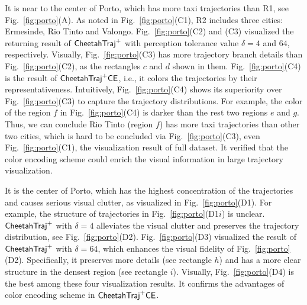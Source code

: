  It is near to the center of Porto, which has more taxi trajectories than R1, see Fig.~\ref{fig:porto}(A).
As noted in Fig.~\ref{fig:porto}(C1), R2 includes three cities: Ermesinde, Rio Tinto and Valongo.
Fig.~\ref{fig:porto}(C2) and (C3) visualized the returning result of $\mathsf{CheetahTraj}^{+}$ with perception tolerance value $\delta=4$ and $64$, respectively.
Visually, Fig.~\ref{fig:porto}(C3) has more trajectory branch details than Fig.~\ref{fig:porto}(C2), as the rectangles $c$ and $d$ shown in them.
Fig.~\ref{fig:porto}(C4) is the result of $\mathsf{CheetahTraj}^{+}\mathsf{CE}$, i.e., it colors the trajectories by their representativeness.
Intuitively, Fig.~\ref{fig:porto}(C4) shows its superiority over Fig.~\ref{fig:porto}(C3) to capture the trajectory distributions.
For example, the color of the region $f$ in Fig.~\ref{fig:porto}(C4) is {darker} than the rest two regions $e$ and $g$.
Thus, we can conclude Rio Tinto (region $f$) has more taxi trajectories than other two cities, which is hard to be concluded via Fig.~\ref{fig:porto}(C3), even Fig.~\ref{fig:porto}(C1), the visualization result of full dataset.
It verified that the color encoding scheme could enrich the visual information in large trajectory visualization.

 It is the center of Porto, which has the highest concentration of the trajectories and causes serious visual clutter, as visualized in Fig.~\ref{fig:porto}(D1).
For example, the structure of trajectories in Fig.~\ref{fig:porto}(D1$i$) is unclear.
$\mathsf{CheetahTraj}^{+}$ with $\delta=4$ alleviates the visual clutter and preserves the trajectory distribution, see Fig.~\ref{fig:porto}(D2).
Fig.~\ref{fig:porto}(D3) visualized the result of $\mathsf{CheetahTraj}^{+}$ with $\delta=64$, which enhances the visual fidelity of Fig.~\ref{fig:porto}(D2).
Specifically, it preserves more details (see rectangle $h$) and has a more clear structure in the {densest} region (see rectangle $i$).
Visually, Fig.~\ref{fig:porto}(D4) is the best among these four visualization results.
It confirms the advantages of color encoding scheme in $\mathsf{CheetahTraj}^{+}\mathsf{CE}$.



